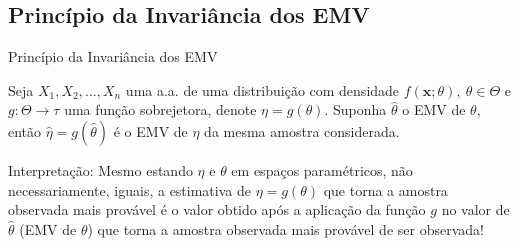 \documentclass[12pt]{beamer}
\begin{document}
%

\subsection{Princípio da Invariância dos EMV}
\begin{frame}{Princípio da Invariância dos EMV}
\begin{Teorema}\label{Teo2}
\justifying
Seja $X_1, X_2, ..., X_n$ uma a.a. de uma distribuição com densidade $f(\boldsymbol{x};\theta),~\theta \in \Theta$ e $g: \Theta\rightarrow \tau$ uma função sobrejetora, denote $\eta=g(\theta).$ Suponha $\hat{\theta}$ o EMV de $\theta$, então $\hat{\eta}=g(\hat{\theta})$ é o EMV de $\eta$ da mesma amostra considerada.
\end{Teorema}
\pause
\begin{block}{Interpretação:}
	\justifying
	Mesmo estando $\eta$ e $\theta$ em espaços paramétricos, não necessariamente, iguais, a estimativa de $\eta=g(\theta)$ que torna a amostra observada mais provável é o valor obtido após a aplicação da função $g$ no valor de $\hat{\theta}$ (EMV de $\theta$) que torna a amostra observada mais provável de ser observada!
\end{block}
\end{frame}
\end{document}
